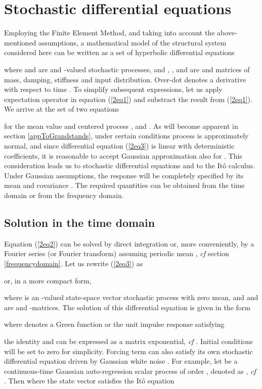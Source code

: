 \documentclass[preprint,12pt,authoryear]{elsarticle}
\begin{document}
\section{Stochastic differential equations}
\label{SDE}
Employing the Finite Element Method, and taking into account the above-mentioned assumptions, a mathematical model of the structural system considered here can be written as a set of hyperbolic differential equations

where  and  are  and -valued stochastic processes, and , ,  and  are  and  matrices of mass, damping, stiffness and input distribution. Over-dot denotes a derivative with respect to time . To simplify subsequent expressions, let us apply expectation operator  in equation (\ref{2eq1}) and substract the result from (\ref{2eq1}). We arrive at the set of two equations

for the mean value  and centered process ,  and . As will become apparent in section \ref{appToGrandstands}, under certain conditions process  is approximately normal, and since differential equation (\ref{2eq3}) is linear with deterministic coefficients, it is reasonable to accept Gaussian approximation also for . This consideration leads us to stochastic differential equations and to the It\^{o} calculus. Under Gaussian assumptions, the response will be completely specified by its mean  and covariance . The required quantities can be obtained from the time domain or from the frequency domain.

\subsection{Solution in the time domain}
\label{timedomain}
Equation (\ref{2eq2}) can be solved by direct integration or, more conveniently, by a Fourier series (or Fourier transform) assuming periodic mean , \textit{cf} section \ref{frequencydomain}. Let us rewrite (\ref{2eq3}) as

or, in a more compact form,

where  is an -valued state-space vector stochastic process with zero mean, and  and  are  and -matrices. The solution of this differential equation is given in the form

where  denotes a Green function or the unit impulse response satisfying

 the identity and  can be expressed as a matrix exponential, \textit{cf} \citep{Soong}. Initial conditions  will be set to zero for simplicity. Forcing term  can also satisfy its own stochastic differential equation driven by Gaussian white noise . For example, let  be a continuous-time Gaussian auto-regression scalar process of order , denoted as , \textit{cf} \citep{Brockwell}. Then  where the state vector  satisfies the It\^{o} equation
\end{document}
